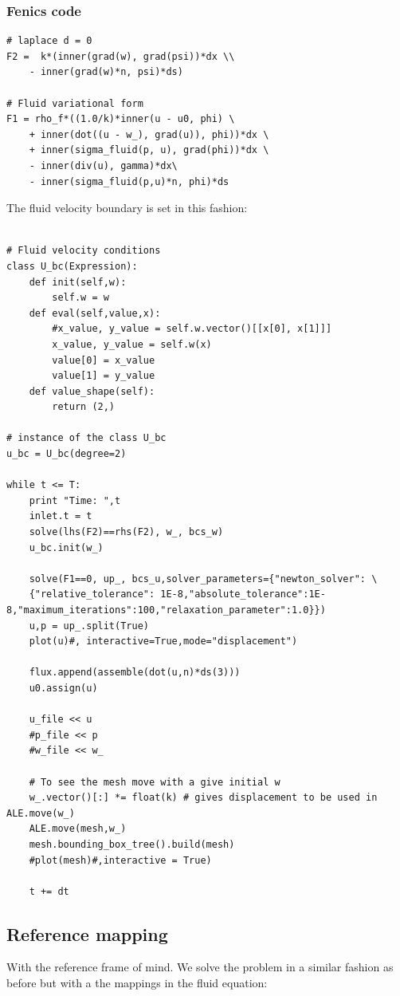 \subsubsection{Fenics code}
\begin{lstlisting}[frame=single]
# laplace d = 0
F2 =  k*(inner(grad(w), grad(psi))*dx \\
    - inner(grad(w)*n, psi)*ds)

# Fluid variational form
F1 = rho_f*((1.0/k)*inner(u - u0, phi) \
    + inner(dot((u - w_), grad(u)), phi))*dx \
    + inner(sigma_fluid(p, u), grad(phi))*dx \
    - inner(div(u), gamma)*dx\
    - inner(sigma_fluid(p,u)*n, phi)*ds
\end{lstlisting}
The fluid velocity boundary is set in this fashion:
\begin{lstlisting}[frame=single]

# Fluid velocity conditions
class U_bc(Expression):
    def init(self,w):
        self.w = w
    def eval(self,value,x):
        #x_value, y_value = self.w.vector()[[x[0], x[1]]]
        x_value, y_value = self.w(x)
        value[0] = x_value
        value[1] = y_value
    def value_shape(self):
        return (2,)
      
# instance of the class U_bc      
u_bc = U_bc(degree=2)

while t <= T:
    print "Time: ",t
    inlet.t = t
    solve(lhs(F2)==rhs(F2), w_, bcs_w)
    u_bc.init(w_)

    solve(F1==0, up_, bcs_u,solver_parameters={"newton_solver": \
    {"relative_tolerance": 1E-8,"absolute_tolerance":1E-8,"maximum_iterations":100,"relaxation_parameter":1.0}})
    u,p = up_.split(True)
    plot(u)#, interactive=True,mode="displacement")

    flux.append(assemble(dot(u,n)*ds(3)))
    u0.assign(u)

    u_file << u
    #p_file << p
    #w_file << w_

    # To see the mesh move with a give initial w
    w_.vector()[:] *= float(k) # gives displacement to be used in ALE.move(w_)
    ALE.move(mesh,w_)
    mesh.bounding_box_tree().build(mesh)
    #plot(mesh)#,interactive = True)

    t += dt
\end{lstlisting}


\subsection*{Reference mapping}
With the reference frame of mind. We solve the problem in a similar fashion as before but with a the mappings in the fluid equation:


